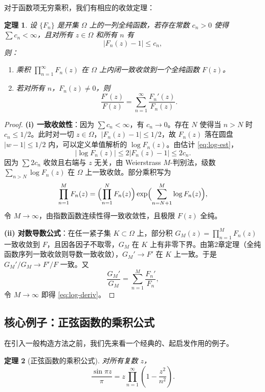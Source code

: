\documentclass[UTF8]{ctexart}
\newtheorem{theorem}{定理}[section]
\numberwithin{equation}{section}
\begin{document}
对于函数项无穷乘积，我们有相应的收敛定理：

\begin{theorem}\label{thm:func-product}
设 \(\{F_n\}\) 是开集 \(\Omega\) 上的一列全纯函数，若存在常数 \(c_n > 0\) 使得 \(\sum c_n < \infty\)，且对所有 \(z \in \Omega\) 和所有 \(n\) 有
\[
|F_n(z) - 1| \le c_n,
\]
则：
\begin{enumerate}
\item 乘积 \(\prod_{n=1}^\infty F_n(z)\) 在 \(\Omega\) 上内闭一致收敛到一个全纯函数 \(F(z)\)。
\item 若对所有 \(n\)，\(F_n(z) \neq 0\)，则
\begin{equation}\label{eq:log-deriv}
\frac{F'(z)}{F(z)} = \sum_{n=1}^\infty \frac{F_n'(z)}{F_n(z)}.
\end{equation}
\end{enumerate}
\end{theorem}

\begin{proof}
\textbf{(i) 一致收敛性}：因为 \(\sum c_n < \infty\)，有 \(c_n \to 0\)。存在 \(N\) 使得当 \(n > N\) 时 \(c_n \le 1/2\)。此时对一切 \(z \in \Omega\)，\(|F_n(z)-1| \le 1/2\)，故 \(F_n(z)\) 落在圆盘 \(|w-1| \le 1/2\) 内，可以定义单值解析的 \(\log F_n(z)\)。由估计 \eqref{eq:log-est}，
\[
|\log F_n(z)| \le 2|F_n(z)-1| \le 2c_n.
\]
因为 \(\sum 2c_n\) 收敛且右端与 \(z\) 无关，由 Weierstrass \(M\)-判别法，级数 \(\sum_{n > N} \log F_n(z)\) 在 \(\Omega\) 上一致收敛。部分乘积写为
\[
\prod_{n=1}^M F_n(z) = \Bigl( \prod_{n=1}^N F_n(z) \Bigr) \exp\Bigl( \sum_{n=N+1}^M \log F_n(z) \Bigr),
\]
令 \(M \to \infty\)，由指数函数连续性得一致收敛性，且极限 \(F(z)\) 全纯。

\textbf{(ii) 对数导数公式}：在任一紧子集 \(K \subset \Omega\) 上，部分积 \(G_M(z) = \prod_{n=1}^M F_n(z)\) 一致收敛到 \(F\)，且因各因子不取零，\(G_M\) 在 \(K\) 上有非零下界。由第2章定理（全纯函数序列一致收敛则导数一致收敛），\(G_M' \to F'\) 在 \(K\) 上一致。于是 \(G_M'/G_M \to F'/F\) 一致。又
\[
\frac{G_M'}{G_M} = \sum_{n=1}^M \frac{F_n'}{F_n},
\]
令 \(M \to \infty\) 即得 \eqref{eq:log-deriv}。
\end{proof}

\subsection{核心例子：正弦函数的乘积公式}

在引入一般构造方法之前，我们先来看一个经典的、起启发作用的例子。

\begin{theorem}[正弦函数的乘积公式]\label{thm:sin-prod}
对所有复数 \(z\)，
\begin{equation}\label{eq:sin-prod}
\frac{\sin \pi z}{\pi} = z \prod_{n=1}^\infty \left(1 - \frac{z^2}{n^2}\right).
\end{equation}
\end{theorem}
\end{document}
